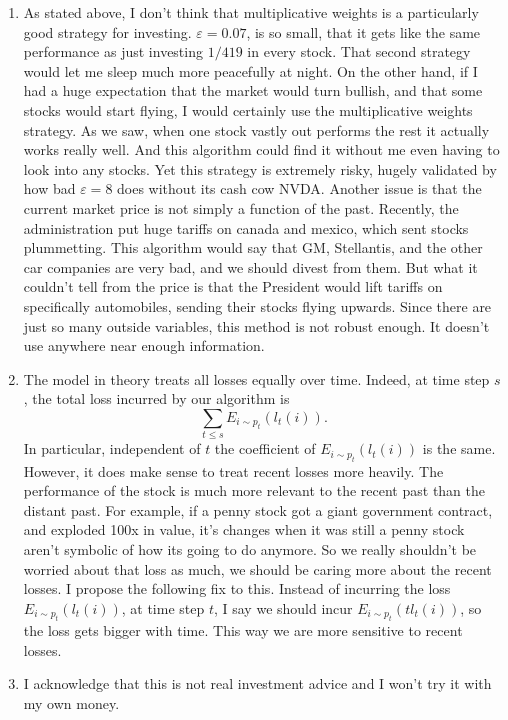 \documentclass[12pt]{article}
\def\ve{\varepsilon}
\begin{document}
\begin{enumerate}[label=(\alph*)]
        \item As stated above, I don't think that multiplicative weights is a particularly good strategy for investing. $\ve = 0.07$, is so small, that it gets like the same performance as just investing $1/419$ in every stock. That second strategy would let me sleep much more peacefully at night. On the other hand, if I had a huge expectation that the market would turn bullish, and that some stocks would start flying, I would certainly use the multiplicative weights strategy. As we saw, when one stock vastly out performs the rest it actually works really well. And this algorithm could find it without me even having to look into any stocks. Yet this strategy is extremely risky, hugely validated by how bad $\ve = 8$ does without its cash cow NVDA. Another issue is that the current market price is not simply a function of the past. Recently, the administration put huge tariffs on canada and mexico, which sent stocks plummetting. This algorithm would say that GM, Stellantis, and the other car companies are very bad, and we should divest from them. But what it couldn't tell from the price is that the President would lift tariffs on specifically automobiles, sending their stocks flying upwards. Since there are just so many outside variables, this method is not robust enough. It doesn't use anywhere near enough information. 

        \item The model in theory treats all losses equally over time. Indeed, at time step $s$, the total loss incurred by our algorithm is
        $$\sum_{t \leq s} E_{i \sim p_t}(l_t(i)).$$ In particular, independent of $t$ the coefficient of $E_{i \sim p_t}(l_t(i))$ is the same. However, it does make sense to treat recent losses more heavily. The performance of the stock is much more relevant to the recent past than the distant past. For example, if a penny stock got a giant government contract, and exploded 100x in value, it's changes when it was still a penny stock aren't symbolic of how its going to do anymore. So we really shouldn't be worried about that loss as much, we should be caring more about the recent losses. I propose the following fix to this. Instead of incurring the loss $E_{i \sim p_t}(l_t(i))$, at time step $t$, I say we should incur $E_{i \sim p_t}(tl_t(i))$, so the loss gets bigger with time. This way we are more sensitive to recent losses.

        \item I acknowledge that this is not real investment advice and I won't try it with my own money.


\end{enumerate}
\end{document}
